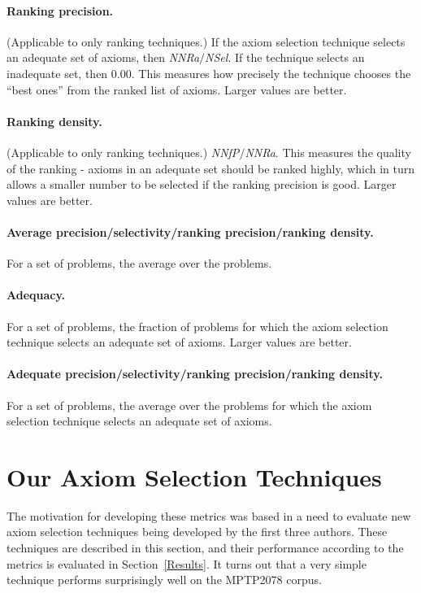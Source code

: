 \documentclass[EPiC]{easychair}
\begin{document}
\paragraph{Ranking precision.}
(Applicable to only ranking techniques.)
If the axiom selection technique selects an adequate set of axioms, then
\emph{NNRa}$/$\emph{NSel}.
If the technique selects an inadequate set, then $0.00$.
This measures how precisely the technique chooses the ``best ones'' from
the ranked list of axioms.
Larger values are better.

\paragraph{Ranking density.}
(Applicable to only ranking techniques.)
\emph{NNfP}$/$\emph{NNRa}.
This measures the quality of the ranking - axioms in an adequate set should
be ranked highly, which in turn allows a smaller number to be selected if
the ranking precision is good.
Larger values are better.

\paragraph{Average precision/selectivity/ranking precision/ranking density.}
For a set of problems, the average over the problems.

\paragraph{Adequacy.}
For a set of problems, the fraction of problems for which the axiom 
selection technique selects an adequate set of axioms.
Larger values are better.

\paragraph{Adequate precision/selectivity/ranking precision/ranking density.}
For a set of problems, the average over the problems for which the axiom
selection technique selects an adequate set of axioms.

\section{Our Axiom Selection Techniques}
\label{Ours}

The motivation for developing these metrics was based in a need to evaluate
new axiom selection techniques being developed by the first three authors.
These techniques are described in this section, and their performance
according to the metrics is evaluated in Section~\ref{Results}.
It turns out that a very simple technique performs surprisingly well
on the MPTP2078 corpus.
\end{document}
